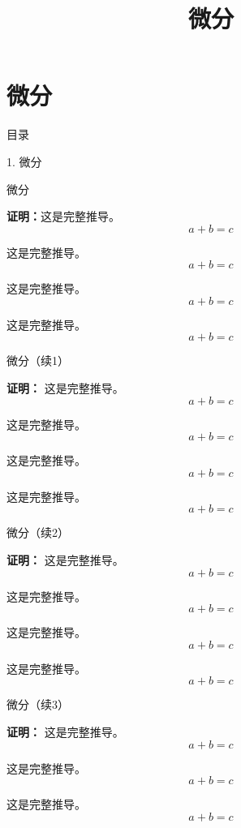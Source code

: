 \documentclass[aspectratio=169,10pt,fontset=fandol]{ctexbeamer}
\title{微分}
\newenvironment{proofdetail}{\par\noindent\textbf{证明：}\quad}{\par}
\begin{document}
\section{微分}
\begin{frame}[t,fragile]{目录}
\normalsize
{\color{blue}\normalsize 1. 微分\par}\vspace{0.22em}
\end{frame}
\begin{frame}[t,fragile]{微分}
\footnotesize
{\footnotesize
\begin{extra}\begin{proofdetail}这是完整推导。\[a+b=c\]

这是完整推导。\[a+b=c\]

这是完整推导。\[a+b=c\]

这是完整推导。\[a+b=c\]


\end{proofdetail}\end{extra}
}
\end{frame}
\begin{frame}[t,fragile]{微分（续1）}
\footnotesize
{\footnotesize
\begin{extra}\begin{proofdetail}
这是完整推导。\[a+b=c\]

这是完整推导。\[a+b=c\]

这是完整推导。\[a+b=c\]

这是完整推导。\[a+b=c\]


\end{proofdetail}\end{extra}
}
\end{frame}
\begin{frame}[t,fragile]{微分（续2）}
\footnotesize
{\footnotesize
\begin{extra}\begin{proofdetail}
这是完整推导。\[a+b=c\]

这是完整推导。\[a+b=c\]

这是完整推导。\[a+b=c\]

这是完整推导。\[a+b=c\]


\end{proofdetail}\end{extra}
}
\end{frame}
\begin{frame}[t,fragile]{微分（续3）}
\small
{\small
\begin{extra}\begin{proofdetail}
这是完整推导。\[a+b=c\]

这是完整推导。\[a+b=c\]

这是完整推导。\[a+b=c\]

\end{proofdetail}\end{extra}
}
\end{frame}
\end{document}
